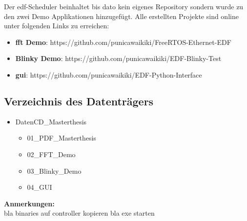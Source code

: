 \documentclass[../EDF Master Thesis.tex]{subfiles}
\begin{document}
Der \ac{edf}-Scheduler beinhaltet bis dato kein eigenes Repository sondern wurde zu den zwei Demo Applikationen hinzugefügt.
Alle erstellten Projekte sind online unter folgenden Links zu erreichen:

\begin{itemize}
    \item \textbf{\ac{fft} Demo}: https://github.com/punicawaikiki/FreeRTOS-Ethernet-EDF
    \item \textbf{Blinky Demo}: https://github.com/punicawaikiki/EDF-Blinky-Test
    \item \textbf{\ac{gui}}: https://github.com/punicawaikiki/EDF-Python-Interface
\end{itemize}

\subsection{Verzeichnis des Datenträgers}

\begin{itemize}
    \item Daten\-CD\_Masterthesis
    \begin{itemize}
        \item 01\_PDF\_Masterthesis
        \item 02\_FFT\_Demo
        \item 03\_Blinky\_Demo
        \item 04\_GUI
    \end{itemize}
\end{itemize}

\textbf{Anmerkungen:}\\
bla binaries auf controller kopieren
bla exe starten
\end{document}
